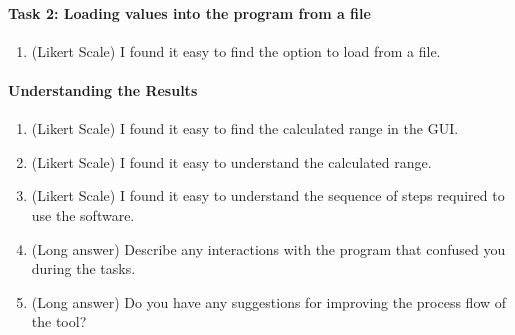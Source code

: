 \documentclass[12pt, titlepage]{article}
\begin{document}
\paragraph{Task 2: Loading values into the program from a file}
\begin{enumerate}
	\item (Likert Scale) I found it easy to find the option to load from a file.
\end{enumerate}

\paragraph{Understanding the Results}
\begin{enumerate}
	\item (Likert Scale) I found it easy to find the calculated range in the 
	GUI.
	
	\item (Likert Scale) I found it easy to understand the calculated range. 
	
	\item (Likert Scale) I found it easy to understand the sequence of steps 
	required to use the software. 
	
	\item (Long answer) Describe any interactions with the program that 
	confused you during the tasks.
	
	\item (Long answer)  Do you have any suggestions for improving the process 
	flow of the tool?
\end{enumerate}
\end{document}
